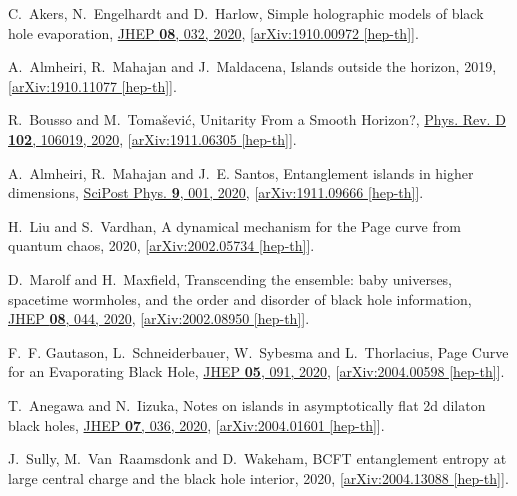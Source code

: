 \documentclass[11pt]{article}
\numberwithin{equation}{section}
\begin{document}
\begin{thebibliography}{10}
C.~Akers, N.~Engelhardt and D.~Harlow, {{Simple holographic models of black
  hole evaporation}}, \href{http://dx.doi.org/10.1007/JHEP08(2020)032}{JHEP
  {\bf 08}, 032, 2020},
  [\href{http://arxiv.org/abs/arXiv:1910.00972}{{arXiv:1910.00972 [hep-th]}}].

A.~Almheiri, R.~Mahajan and J.~Maldacena, {{Islands outside the horizon}},
  2019, [\href{http://arxiv.org/abs/arXiv:1910.11077}{{arXiv:1910.11077
  [hep-th]}}].

R.~Bousso and M.~Toma\v{s}evi\'c, {{Unitarity From a Smooth Horizon?}},
  \href{http://dx.doi.org/10.1103/PhysRevD.102.106019}{Phys. Rev. D {\bf 102},
  106019, 2020},
  [\href{http://arxiv.org/abs/arXiv:1911.06305}{{arXiv:1911.06305 [hep-th]}}].

A.~Almheiri, R.~Mahajan and J.~E. Santos, {{Entanglement islands in higher
  dimensions}}, \href{http://dx.doi.org/10.21468/SciPostPhys.9.1.001}{SciPost
  Phys. {\bf 9}, 001, 2020},
  [\href{http://arxiv.org/abs/arXiv:1911.09666}{{arXiv:1911.09666 [hep-th]}}].

H.~Liu and S.~Vardhan, {{A dynamical mechanism for the Page curve from quantum
  chaos}},  2020,
  [\href{http://arxiv.org/abs/arXiv:2002.05734}{{arXiv:2002.05734 [hep-th]}}].

D.~Marolf and H.~Maxfield, {{Transcending the ensemble: baby universes,
  spacetime wormholes, and the order and disorder of black hole information}},
  \href{http://dx.doi.org/10.1007/JHEP08(2020)044}{JHEP {\bf 08}, 044, 2020},
  [\href{http://arxiv.org/abs/arXiv:2002.08950}{{arXiv:2002.08950 [hep-th]}}].

F.~F. Gautason, L.~Schneiderbauer, W.~Sybesma and L.~Thorlacius, {{Page Curve
  for an Evaporating Black Hole}},
  \href{http://dx.doi.org/10.1007/JHEP05(2020)091}{JHEP {\bf 05}, 091, 2020},
  [\href{http://arxiv.org/abs/arXiv:2004.00598}{{arXiv:2004.00598 [hep-th]}}].

T.~Anegawa and N.~Iizuka, {{Notes on islands in asymptotically flat 2d dilaton
  black holes}}, \href{http://dx.doi.org/10.1007/JHEP07(2020)036}{JHEP {\bf
  07}, 036, 2020},
  [\href{http://arxiv.org/abs/arXiv:2004.01601}{{arXiv:2004.01601 [hep-th]}}].

J.~Sully, M.~Van~Raamsdonk and D.~Wakeham, {{BCFT entanglement entropy at large
  central charge and the black hole interior}},  2020,
  [\href{http://arxiv.org/abs/arXiv:2004.13088}{{arXiv:2004.13088 [hep-th]}}].


\end{thebibliography}
\end{document}
